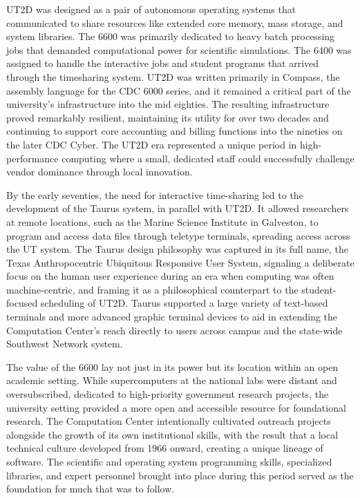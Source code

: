 UT2D was designed as a pair of autonomous operating systems that communicated to share resources like extended core memory, mass storage, and system libraries. The 6600 was primarily dedicated to heavy batch processing jobs that demanded computational power for scientific simulations. The 6400 was assigned to handle the interactive jobs and student programs that arrived through the timesharing system. UT2D was written primarily in Compass, the assembly language for the CDC 6000 series, and it remained a critical part of the university’s infrastructure into the mid eighties. The resulting infrastructure proved remarkably resilient, maintaining its utility for over two decades and continuing to support core accounting and billing functions into the nineties on the later CDC Cyber. The UT2D era represented a unique period in high-performance computing where a small, dedicated staff could successfully challenge vendor dominance through local innovation. 

By the early seventies, the need for interactive time-sharing led to the development of the Taurus system, in parallel with UT2D. It allowed researchers at remote locations, such as the Marine Science Institute in Galveston, to program and access data files through teletype terminals, spreading access across the UT system. The Taurus design philosophy was captured in its full name, the Texas Anthropocentric Ubiquitous Responsive User System, signaling a deliberate focus on the human user experience during an era when computing was often machine-centric, and framing it as a philosophical counterpart to the student-focused scheduling of UT2D. Taurus supported a large variety of text-based terminals and more advanced graphic terminal devices to aid in extending the Computation Center's reach directly to users across campus and the state-wide Southwest Network system. 

The value of the 6600 lay not just in its power but its location within an open academic setting. While supercomputers at the national labs were distant and oversubscribed, dedicated to high-priority government research projects, the university setting provided a more open and accessible resource for foundational research. The Computation Center intentionally cultivated outreach projects alongside the growth of its own institutional skills, with the result that a local technical culture developed from 1966 onward, creating a unique lineage of software. The scientific and operating system programming skills, specialized libraries, and expert personnel brought into place during this period served as the foundation for much that was to follow.

